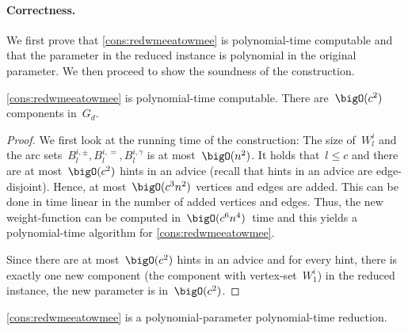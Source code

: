 \paragraph{Correctness.} We first prove that \autoref{cons:redwmeeatowmee} is polynomial-time computable and that the parameter in the reduced instance is polynomial in the original parameter. We then proceed to show the soundness of the construction.
\begin{observation}\label{obs:redwmeeatowmeepoly}
  \autoref{cons:redwmeeatowmee} is polynomial-time computable. There are~$\bigO(c^2)$ components in~$G_d$.
\end{observation}
\begin{proof}
  We first look at the running time of the construction: The size of~$W^i_l$ and the arc sets~$B^{i,\pm}_l, B^{i,=}_l, B^{i,\gamma}_l$ is at most~$\bigO(n^2)$. It holds that~$l \leq c$ and there are at most~$\bigO(c^2)$ hints in an advice (recall that hints in an advice are edge-disjoint). Hence, at most~$\bigO(c^3n^2)$ vertices and edges are added. This can be done in time linear in the number of  added vertices and edges. Thus, the new weight-function can be computed in~$\bigO(c^6n^4)$~time and this yields a polynomial-time algorithm for \autoref{cons:redwmeeatowmee}.

  Since there are at most~$\bigO(c^2)$ hints in an advice and for every hint, there is exactly one new component (the component with vertex-set~$W^i_1$) in the reduced instance, the new parameter is in~$\bigO(c^2)$.
\end{proof}
\begin{lemma}
  \autoref{cons:redwmeeatowmee} is a polynomial-parameter polynomial-time reduction.
\end{lemma}
